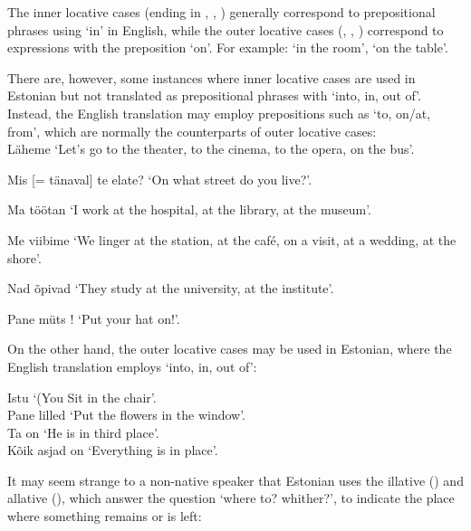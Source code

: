 
\newLesson %

\Grammar %


The inner locative cases (ending in , , ) generally correspond to prepositional phrases using `in' in English, while the outer locative cases (, , ) correspond to expressions with the preposition `on'. For example:  `in the room',  `on the table'.

\newSection There are, however, some instances where inner locative cases are used in Estonian but not translated as prepositional phrases with `into, in, out of'. Instead, the English translation may employ prepositions such as `to, on/at, from', which are normally the counterparts of outer locative cases: \\

Läheme  `Let's go to the theater, to the cinema, to the opera, on the bus'.

Mis  [= tänaval] te elate? `On what street do you \pl live?'.

Ma töötan  `I work at the hospital, at the library, at the museum'.

Me viibime  `We linger at the station, at the café, on a visit, at a wedding, at the shore'.

Nad õpivad  `They study at the university, at the institute'.

Pane müts ! `Put your hat on!'.

\newSection On the other hand, the outer locative cases may be used in Estonian, where the English translation employs `into, in, out of':

	\oneColumnTable
	Istu  `(You \sing Sit in the chair'. \\
	Pane lilled  `Put the flowers in the window'. \\
	Ta on  `He is in third place'. \\
	Kõik asjad on  `Everything is in place'.
	\tableEnd


\newSection It may seem strange to a non-native speaker that Estonian uses the illative () and allative (), which answer the question `where to? whither?', to indicate the place where something remains or is left: \\

